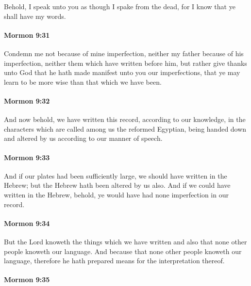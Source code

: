 			Behold, I speak unto you as though I spake from the dead,
			for I know that ye shall have my words.

		\paragraph{Mormon 9:31} %
			\label{MORMON-9-31}

			Condemn me not because of mine imperfection,
			neither my father because of his imperfection,
			neither them which have written before him,
			but rather give thanks unto God
			that he hath made manifest unto you our imperfections,
			that ye may learn to be more wise than that which we have been.

		\paragraph{Mormon 9:32} %
			\label{MORMON-9-32}

			And now behold, we have written this record,
			according to our knowledge,
			in the characters which are called among us the reformed Egyptian,
			being handed down and altered by us according to our manner of speech.

		\paragraph{Mormon 9:33} %
			\label{MORMON-9-33}

			And if our plates had been sufficiently large,
			we should have written in the Hebrew;
			but the Hebrew hath been altered by us also.
			And if we could have written in the Hebrew,
			behold, ye would have had none imperfection in our record.

		\paragraph{Mormon 9:34} %
			\label{MORMON-9-34}

			But the Lord knoweth the things which we have written
			and also that none other people knoweth our language.
			And because that none other people knoweth our language,
			therefore he hath prepared means for the interpretation thereof.

		\paragraph{Mormon 9:35} %
			\label{MORMON-9-35}

